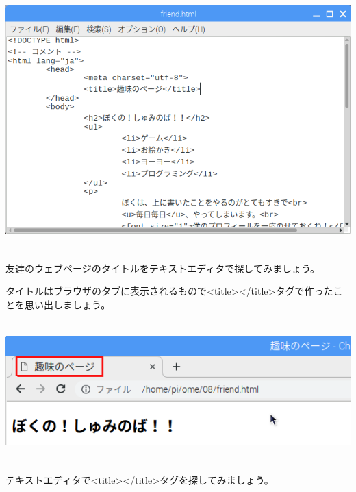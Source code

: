 \documentclass[a4paper,12pt,dvipdfmx]{jarticle}
\begin{document}
\begin{center}
\includegraphics[width=15.074cm,height=9.98cm]{textbook-img008.png}

\end{center}


\bigskip


\bigskip

\clearpage
友達のウェブページのタイトルをテキストエディタで探してみましょう。

タイトルはブラウザのタブに表示されるもので{\textless}title{\textgreater}{\textless}/title{\textgreater}タグで作ったことを思い出しましょう。



\begin{center}
\includegraphics[width=16.782cm,height=5.389cm]{textbook-img009.png}

\end{center}

\bigskip

テキストエディタで{\textless}title{\textgreater}{\textless}/title{\textgreater}タグを探してみましょう。
\end{document}
